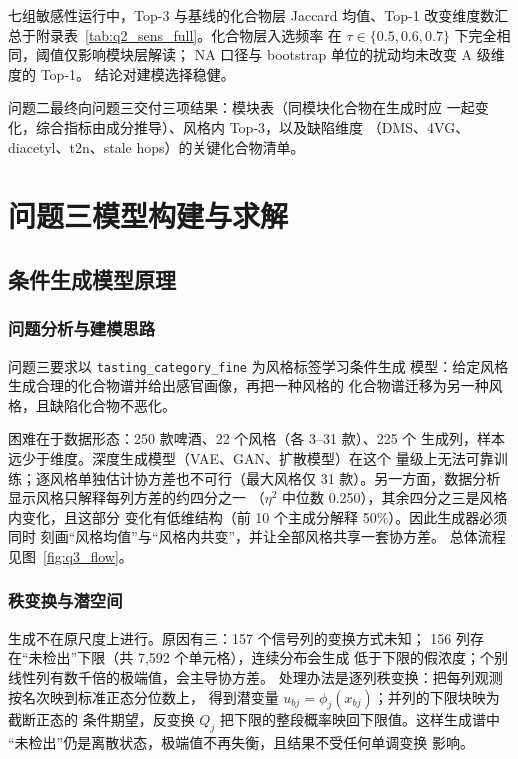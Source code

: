 \documentclass[12pt,a4paper]{article}
\begin{document}
七组敏感性运行中，Top-3 与基线的化合物层 Jaccard 均值、Top-1
改变维度数汇总于附录表~\ref{tab:q2_sens_full}。化合物层入选频率
在 $\tau\in\{0.5,0.6,0.7\}$ 下完全相同，阈值仅影响模块层解读；
NA 口径与 bootstrap 单位的扰动均未改变 A 级维度的 Top-1。
结论对建模选择稳健。

问题二最终向问题三交付三项结果：模块表（同模块化合物在生成时应
一起变化，综合指标由成分推导）、风格内 Top-3，以及缺陷维度
（DMS、4VG、diacetyl、t2n、stale hops）的关键化合物清单。
\section{问题三模型构建与求解}

\subsection{条件生成模型原理}

\subsubsection{问题分析与建模思路}

问题三要求以 \verb|tasting_category_fine| 为风格标签学习条件生成
模型：给定风格生成合理的化合物谱并给出感官画像，再把一种风格的
化合物谱迁移为另一种风格，且缺陷化合物不恶化。

困难在于数据形态：250 款啤酒、22 个风格（各 3--31 款）、225 个
生成列，样本远少于维度。深度生成模型（VAE、GAN、扩散模型）在这个
量级上无法可靠训练；逐风格单独估计协方差也不可行（最大风格仅 31
款）。另一方面，数据分析显示风格只解释每列方差的约四分之一
（$\eta^2$ 中位数 0.250），其余四分之三是风格内变化，且这部分
变化有低维结构（前 10 个主成分解释 50\%）。因此生成器必须同时
刻画``风格均值''与``风格内共变''，并让全部风格共享一套协方差。
总体流程见图~\ref{fig:q3_flow}。


\subsubsection{秩变换与潜空间}

生成不在原尺度上进行。原因有三：157 个信号列的变换方式未知；
156 列存在``未检出''下限（共 7{,}592 个单元格），连续分布会生成
低于下限的假浓度；个别线性列有数千倍的极端值，会主导协方差。
处理办法是逐列秩变换：把每列观测按名次映到标准正态分位数上，
得到潜变量 $u_{bj}=\phi_j(x_{bj})$；并列的下限块映为截断正态的
条件期望，反变换 $Q_j$ 把下限的整段概率映回下限值。这样生成谱中
``未检出''仍是离散状态，极端值不再失衡，且结果不受任何单调变换
影响。
\end{document}
